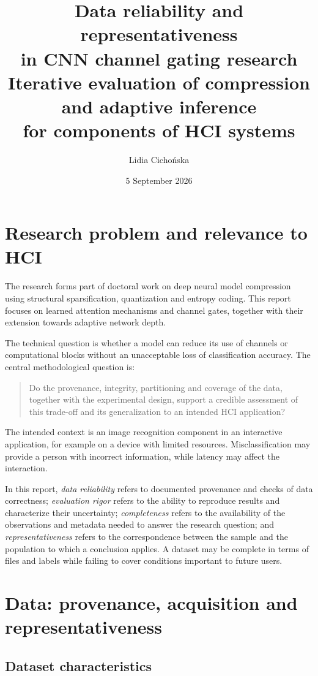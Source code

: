 \documentclass[12pt,a4paper]{article}
\title{Data reliability and representativeness\\
in CNN channel gating research\\[0.5em]
\large Iterative evaluation of compression and adaptive inference\\
for components of HCI systems}
\author{Lidia Cichońska}
\date{5 September 2026}
\begin{document}
\maketitle

\section{Research problem and relevance to HCI}

The research forms part of doctoral work on deep neural model compression
using structural sparsification, quantization and entropy coding.
This report focuses on learned attention mechanisms and channel gates,
together with their extension towards adaptive network depth.

The technical question is whether a model can reduce its use of channels
or computational blocks without an unacceptable loss of classification
accuracy. The central methodological question is:
\begin{quote}
Do the provenance, integrity, partitioning and coverage of the data,
together with the experimental design, support a credible assessment
of this trade-off and its generalization to an intended HCI application?
\end{quote}

The intended context is an image recognition component in an interactive
application, for example on a device with limited resources.
Misclassification may provide a person with incorrect information,
while latency may affect the interaction.

In this report, \emph{data reliability} refers to documented provenance
and checks of data correctness; \emph{evaluation rigor} refers to the
ability to reproduce results and characterize their uncertainty;
\emph{completeness} refers to the availability of the observations and
metadata needed to answer the research question; and
\emph{representativeness} refers to the correspondence between the sample
and the population to which a conclusion applies. A dataset may be complete
in terms of files and labels while failing to cover conditions important
to future users.

\section{Data: provenance, acquisition and representativeness}

\subsection{Dataset characteristics}
\end{document}
